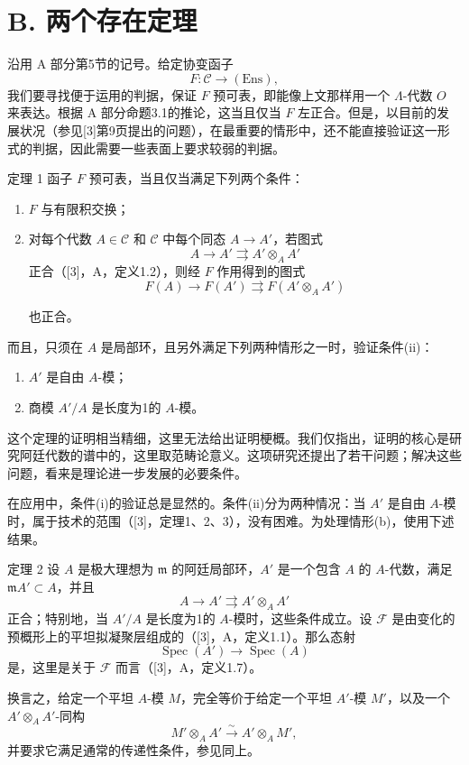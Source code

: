 \section*{B. 两个存在定理}
沿用 A 部分第5节的记号。给定协变函子
\[
 F:\mathcal C\longrightarrow(\mathrm{Ens}),
\]
我们要寻找便于运用的判据，保证 $F$ 预可表，即能像上文那样用一个 $\Lambda$-代数 $O$ 来表达。根据 A 部分命题3.1的推论，这当且仅当 $F$ 左正合。但是，以目前的发展状况（参见[3]第9页提出的问题），在最重要的情形中，还不能直接验证这一形式的判据，因此需要一些表面上要求较弱的判据。
\begin{statement}{定理 1}
函子 $F$ 预可表，当且仅当满足下列两个条件：
\begin{enumerate}
\item[(i)] $F$ 与有限积交换；
\item[(ii)] 对每个代数 $A\in\mathcal C$ 和 $\mathcal C$ 中每个同态 $A\to A'$，若图式
\[
 A\longrightarrow A'\rightrightarrows A'\otimes_A A'
\]
正合（[3]，A，定义1.2），则经 $F$ 作用得到的图式
\[
 F(A)\longrightarrow F(A')\rightrightarrows F(A'\otimes_A A')
\]

也正合。
\end{enumerate}
而且，只须在 $A$ 是局部环，且另外满足下列两种情形之一时，验证条件(ii)：
\begin{enumerate}
\item[(a)] $A'$ 是自由 $A$-模；
\item[(b)] 商模 $A'/A$ 是长度为1的 $A$-模。
\end{enumerate}
\end{statement}
这个定理的证明相当精细，这里无法给出证明梗概。我们仅指出，证明的核心是研究阿廷代数的谱中的，这里取范畴论意义。这项研究还提出了若干问题；解决这些问题，看来是理论进一步发展的必要条件。

在应用中，条件(i)的验证总是显然的。条件(ii)分为两种情况：当 $A'$ 是自由 $A$-模时，属于技术的范围（[3]，定理1、2、3），没有困难。为处理情形(b)，使用下述结果。
\begin{statement}{定理 2}
设 $A$ 是极大理想为 $\mathfrak m$ 的阿廷局部环，$A'$ 是一个包含 $A$ 的 $A$-代数，满足 $\mathfrak mA'\subset A$，并且
\[
 A\longrightarrow A'\rightrightarrows A'\otimes_A A'
\]
正合；特别地，当 $A'/A$ 是长度为1的 $A$-模时，这些条件成立。设 $\mathcal F$ 是由变化的预概形上的平坦拟凝聚层组成的（[3]，A，定义1.1）。那么态射
\[
 \operatorname{Spec}(A')\longrightarrow\operatorname{Spec}(A)
\]
是，这里是关于 $\mathcal F$ 而言（[3]，A，定义1.7）。
\end{statement}
换言之，给定一个平坦 $A$-模 $M$，完全等价于给定一个平坦 $A'$-模 $M'$，以及一个 $A'\otimes_A A'$-同构
\[
 M'\otimes_A A'\xrightarrow{\sim}A'\otimes_A M',
\]
并要求它满足通常的传递性条件，参见同上。

